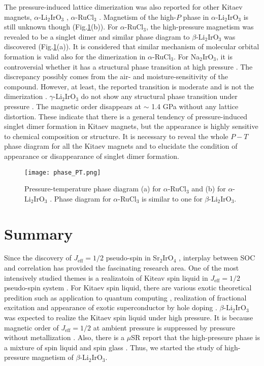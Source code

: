 The pressure-induced lattice dimerization was also reported for other Kitaev magnets, $\alpha$-Li$_2$IrO$_3$ \cite{Hermann2018}, $\alpha$-RuCl$_3$ \cite{Bastien2018}.
Magnetism of the high-$P$ phase in $\alpha$-Li$_2$IrO$_3$ is still unknown though (Fig.\ref{phase_PT}(b)).
For $\alpha$-RuCl$_3$, the high-pressure magnetism was revealed to be a singlet dimer and similar phase diagram to $\beta$-Li$_2$IrO$_3$ was discovered (Fig.\ref{phase_PT}(a)).
It is considered that similar mechanism of molecular orbital formation is valid also for the dimerization in $\alpha$-RuCl$_3$.
For Na$_2$IrO$_3$, it is controversial whether it has a structural phase transition at high pressure \cite{Hermann2017, Xi2018}.
The discrepancy possibly comes from the air- and moisture-sensitivity of the compound.
However, at least, the reported transition is moderate and is not the dimerization \cite{Xi2018}.
$\gamma$-Li$_2$IrO$_3$ do not show any structural phase transition under pressure \cite{breznay2017resonant}.
The magnetic order disappears at $\sim$ 1.4 GPa without any lattice distortion.
These indicate that there is a general tendency of pressure-induced singlet dimer formation in Kitaev magnets,
but the appearance is highly sensitive to chemical composition or structure.
It is necessary to reveal the whole $P-T$ phase diagram for all the Kitaev magnets and to elucidate the condition of appearance or disappearance of singlet dimer formation.

\begin{figure}
  \centering
  \texttt{[image: phase\_PT.png]}
  \caption{Pressure-temperature phase diagram (a) for $\alpha$-RuCl$_3$ \cite{Bastien2018} and (b) for $\alpha$-Li$_2$IrO$_3$ \cite{Hermann2018}.
  Phase diagram for $\alpha$-RuCl$_3$ is similar to one for $\beta$-Li$_2$IrO$_3$.}
  \label{phase_PT}
\end{figure}

\chapter{Summary}
Since the discovery of $J_\mathrm{eff} = 1/2$ pseudo-spin in Sr$_2$IrO$_4$ \cite{kim2008novel, kim2009phase},
interplay between SOC and correlation has provided the fascinating research area.
One of the most intensively studied themes is a realizatoin of Kiteav spin liquid in $J_\mathrm{eff} = 1/2$ pseudo-spin system \cite{kitaev2006anyons, jackeli2009mott}.
For Kitaev spin liquid, there are various exotic theoretical predition such as application to quantum computing \cite{kitaev2006anyons},
realization of fractional excitation \cite{nasu2015thermal, yoshitake2017temperature}
and appearance of exotic superconductor by hole doping \cite{you2012doping}.
$\beta$-Li$_2$IrO$_3$ was expected to realize the Kitaev spin liquid under high pressure.
It is because magnetic order of $J_\mathrm{eff} = 1/2$ at ambient pressure is suppressed by pressure without metallization \cite{takayama2015hyperhoneycomb}.
Also, there is a $\mu$SR report that the high-pressure phase is a mixture of spin liquid and spin glass  \cite{Majumder2018}.
Thus, we started the study of high-pressure magnetism of $\beta$-Li$_2$IrO$_3$.

